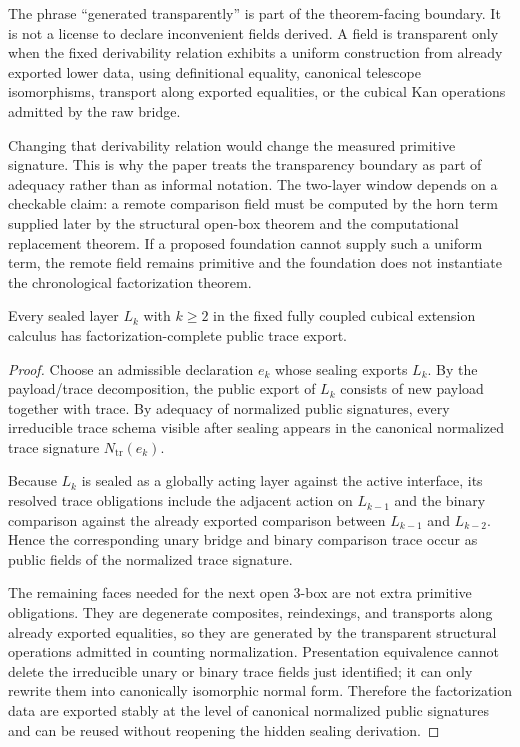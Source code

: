 \begin{remark}
The phrase ``generated transparently'' is part of the theorem-facing boundary.  It is not a
license to declare inconvenient fields derived.  A field is transparent only when the fixed
derivability relation exhibits a uniform construction from already exported lower data, using
definitional equality, canonical telescope isomorphisms, transport along exported equalities,
or the cubical Kan operations admitted by the raw bridge.

Changing that derivability relation would change the measured primitive signature.  This is
why the paper treats the transparency boundary as part of adequacy rather than as informal
notation.  The two-layer window depends on a checkable claim: a remote comparison field
must be computed by the horn term supplied later by the structural open-box theorem and the
computational replacement theorem.  If a proposed foundation cannot supply such a uniform
term, the remote field remains primitive and the foundation does not instantiate the
chronological factorization theorem.
\end{remark}

\begin{theorem}
Every sealed layer \(L_k\) with \(k\geq 2\) in the fixed fully coupled cubical extension calculus
has factorization-complete public trace export.
\end{theorem}

\begin{proof}
Choose an admissible declaration \(e_k\) whose sealing exports \(L_k\).  By the
payload/trace decomposition, the public export of \(L_k\) consists of new payload together
with trace.  By adequacy of normalized public signatures, every irreducible trace schema
visible after sealing appears in the canonical normalized trace signature
\(N_{\mathrm{tr}}(e_k)\).

Because \(L_k\) is sealed as a globally acting layer against the active interface, its resolved
trace obligations include the adjacent action on \(L_{k-1}\) and the binary comparison against
the already exported comparison between \(L_{k-1}\) and \(L_{k-2}\).  Hence the corresponding
unary bridge and binary comparison trace occur as public fields of the normalized trace
signature.

The remaining faces needed for the next open \(3\)-box are not extra primitive obligations.
They are degenerate composites, reindexings, and transports along already exported equalities,
so they are generated by the transparent structural operations admitted in counting
normalization.  Presentation equivalence cannot delete the irreducible unary or binary trace
fields just identified; it can only rewrite them into canonically isomorphic normal form.
Therefore the factorization data are exported stably at the level of canonical normalized
public signatures and can be reused without reopening the hidden sealing derivation.
\end{proof}

